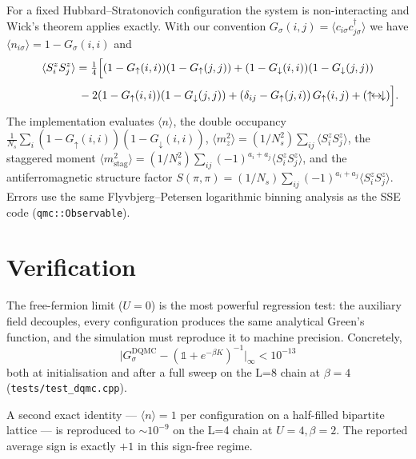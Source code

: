 \documentclass[11pt,a4paper]{article}
\newcommand{\Ns}{N_{s}}
\theoremstyle{plain}
\begin{document}
For a fixed Hubbard--Stratonovich configuration the system is
non-interacting and Wick's theorem applies exactly. With our convention
\(G_\sigma(i,j)=\langle c_{i\sigma} c^{\dagger}_{j\sigma}\rangle\) we have
\(\langle n_{i\sigma}\rangle = 1 - G_\sigma(i,i)\) and
\begin{equation}
\langle S^z_i S^z_j \rangle = \tfrac{1}{4}\Bigl[
  (1 - G_\uparrow(i,i))(1 - G_\uparrow(j,j))
+ (1 - G_\downarrow(i,i))(1 - G_\downarrow(j,j))
\end{equation}
\vspace{-2em}
\begin{equation}
\hphantom{\langle S^z_i S^z_j \rangle = \tfrac{1}{4}\Bigl[}
- 2(1 - G_\uparrow(i,i))(1 - G_\downarrow(j,j))
+ (\delta_{ij} - G_\uparrow(j,i))\,G_\uparrow(i,j)
+ (\uparrow\!\leftrightarrow\!\downarrow)
\Bigr].
\end{equation}
The implementation evaluates
\(\langle n\rangle\), the double occupancy
\(\frac{1}{\Ns}\sum_i (1-G_\uparrow(i,i))(1-G_\downarrow(i,i))\),
\(\langle m_z^2\rangle = (1/\Ns^2)\sum_{ij}\langle S^z_iS^z_j\rangle\),
the staggered moment
\(\langle m_{\text{stag}}^2\rangle = (1/\Ns^2)\sum_{ij} (-1)^{a_i+a_j}
   \langle S^z_iS^z_j\rangle\),
and the antiferromagnetic structure factor
\(S(\pi,\pi) = (1/\Ns)\sum_{ij}(-1)^{a_i+a_j}\langle S^z_iS^z_j\rangle\).
Errors use the same Flyvbjerg--Petersen logarithmic binning analysis as
the SSE code (\texttt{qmc::Observable}).

\section{Verification}

The free-fermion limit ($U=0$) is the most powerful regression test:
the auxiliary field decouples, every configuration produces the same
analytical Green's function, and the simulation must reproduce it to
machine precision. Concretely,
\begin{equation}
\bigl\lvert G_\sigma^{\text{DQMC}} - (\mathbb{1} + e^{-\beta K})^{-1} \bigr\rvert_{\infty}
   < 10^{-13}
\end{equation}
both at initialisation and after a full sweep on the L=8 chain at
$\beta = 4$ (\texttt{tests/test\_dqmc.cpp}).

A second exact identity ---
\(\langle n\rangle = 1\) per configuration on a half-filled bipartite
lattice --- is reproduced to $\sim 10^{-9}$ on the L=4 chain at
$U=4,\beta=2$. The reported average sign is exactly $+1$ in this
sign-free regime.
\end{document}
